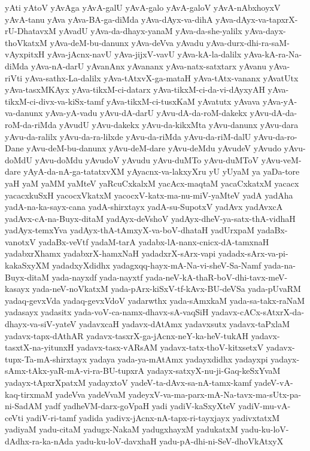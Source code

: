 {yAti
yAtoV
yAvAga
yAvA-galU
yAvA-galo
yAvA-galoV
yAvA-nAbxhoyxV
yAvA-tanu
yAva
yAva-BA-ga-diMda
yAva-dAyx-va-dihA
yAva-dAyx-va-tapxrX-rU-DhatavxM
yAvadU
yAva-da-dhayx-yanaM
yAva-da-she-yalilx
yAva-dayx-thoVkatxM
yAva-deM-bu-danunx
yAva-deVva
yAvadu
yAva-durx-dhi-ra-saM-vAyxpitxH
yAva-jAcnx-navU
yAva-jijxV-vavU
yAva-kA-la-dalilx
yAva-kA-ra-Na-diMda
yAva-nA-darU
yAvanAnx
yAvananx
yAva-natx-satxtarx
yAvanu
yAva-riVti
yAva-sathx-La-dalilx
yAva-tAtxvX-ga-mataH
yAva-tAtx-vananx
yAvatUtx
yAva-tasxMKAyx
yAva-tikxM-ci-datarx
yAva-tikxM-ci-da-vi-dAyxyAH
yAva-tikxM-ci-divx-va-kiSx-tamf
yAva-tikxM-ci-tusxKaM
yAvatutx
yAvava
yAva-yA-va-danunx
yAva-yA-vadu
yAvu-dA-darU
yAvu-dA-da-roM-dakekx
yAvu-dA-da-roM-da-riMda
yAvudU
yAvu-dakekx
yAvu-da-kikxMta
yAvu-danunx
yAvu-dara
yAvu-da-ralilx
yAvu-da-ra-lilxde
yAvu-da-riMda
yAvu-da-riM-dalU
yAvu-da-ro-Dane
yAvu-deM-bu-danunx
yAvu-deM-dare
yAvu-deMdu
yAvudeV
yAvudo
yAvu-doMdU
yAvu-doMdu
yAvudoV
yAvudu
yAvu-duMTo
yAvu-duMToV
yAvu-veM-dare
yAyA-da-nA-ga-tatatxvXM
yAyacnx-va-lakxyXru
yU
yUyaM
ya
yaDa-tore
yaH
yaM
yaMM
yaMteV
yaRcuCxkalxM
yacAcx-maqtaM
yacaCxkatxM
yacacx
yacacxkuSxH
yacocxVkatxM
yacocxV-katx-ma-nu-miV-yaMteV
yadA
yadAha
yadA-na-ka-sayx-cana
yadA-shirxtayx
yadA-su-SupotxV
yadAvx
yadAvxcA
yadAvx-cA-na-Buyx-ditaM
yadAyx-deVshoV
yadAyx-dheV-ya-satx-thA-vidhaH
yadAyx-temxYva
yadAyx-thA-tAmxyX-va-boV-dhataH
yadUrxpaM
yadaBx-vanotxV
yadaBx-veVtf
yadaM-tarA
yadabx-lA-nanx-cnicx-dA-tamxnaH
yadabxrXhamx
yadabxrX-hamxNaH
yadadxrX-sArx-vapi
yadadx-sArx-va-pi-kakaSxyXM
yadadxyXdidhx
yadagxqq-hayx-mA-Na-vi-sheV-Sa-Namf
yada-na-Buyx-ditaM
yada-nayxdf
yada-nayxtf
yada-neV-kA-thaR-boV-dhi-tavx-meV-kasayx
yada-neV-noVkatxM
yada-pArx-kiSxV-tf-kAvx-BU-deVSa
yada-pUvaRM
yadaq-gevxVda
yadaq-gevxVdoV
yadarwthx
yada-sAmxkaM
yada-sa-takx-raNaM
yadasayx
yadasitx
yada-voV-ca-namx-dhavx-sA-vaqSiH
yadavx-cACx-sAtxrX-da-dhayx-va-siV-yateV
yadavxcaH
yadavx-dAtAmx
yadavxsutx
yadavx-taPxlaM
yadavx-tapx-dAthAR
yadavx-tasxrX-ga-jAcnx-neY-ka-heV-tukAH
yadavx-tasxtX-na-yitunxH
yadavx-tasx-vARsAM
yadavx-tatx-thoV-kitxsetxV
yadavx-tupx-Ta-mA-shirxtayx
yadaya
yada-ya-mAtAmx
yadayxdidhx
yadayxpi
yadayx-sAmx-tAkx-yaR-mA-vi-ra-BU-tupxrA
yadayx-satxyX-nu-ji-Gaq-keSxYvaM
yadayx-tApxrXpatxM
yadayxtoV
yadeV-ta-dAvx-sa-nA-tamx-kamf
yadeV-vA-kaq-tirxmaM
yadeVva
yadeVvaM
yadeyxV-va-ma-parx-mA-Na-tavx-ma-sUtx-pa-ni-SadAM
yadf
yadheVM-darx-goVpaH
yadi
yadiV-kaSxyXteV
yadiV-mu-vA-ceVti
yadiV-ri-tamf
yadida
yadivx-jAcnx-nA-tapx-ri-tayxjayx
yadivxtatxM
yadiyaM
yadu-citaM
yadugx-NakaM
yadugxhayxM
yadukatxM
yadu-ku-loV-dAdhx-ra-ka-nAda
yadu-ku-loV-davxhaH
yadu-pA-dhi-ni-SeV-dhoVkAtxyX
}
